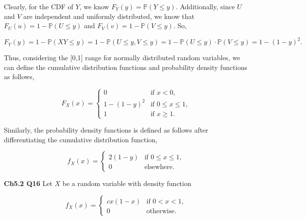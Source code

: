 \documentclass[12pt]{article}
\begin{document}
\begin{enumerate}[label=(\alph*)]
\noindent
Clearly, for the CDF of $Y$, we know $F_Y(y) = \mathbb{P}(Y \leq y)$. Additionally, since $U$ and $V$ are independent and uniformly distributed, we know that $F_U(u) = 1- \mathbb{P}(U \leq y)$ and $F_V(v) = 1- \mathbb{P}(V \leq y)$. So, 

\begin{equation*}
F_Y(y) = 1 - \mathbb{P}(XY\leq y) = 1- \mathbb{P}(U \leq y, V \leq y) = 1 - \mathbb{P}(U \leq y) \cdot \mathbb{P}(V \leq y) = 1 - (1-y)^2.
\end{equation*}

\noindent
Thus, considering the [0,1] range for normally distributed random variables, we can define the cumulative distribution functions and probability density functions as follows,

\[ F_X(x) =  \begin{cases} 
	  0 & \text{if } x < 0, \\
      1 - (1-y)^2 & \text{if } 0 \leq x \leq 1, \\
      1 & \text{if } x \geq 1.
      \end{cases} \]

\noindent
Similarly, the probability density functions is defined as follows after differentiating the cumulative distribution function,

\[ f_X(x) =  \begin{cases} 
      2(1-y)  & \text{if } 0 \leq x \leq 1, \\
      0 & \text{elsewhere}.
      \end{cases} \]

\end{enumerate}


\vspace*{1cm}
\noindent
\textbf{Ch5.2 Q16} Let $X$ be a random variable with density function

\[ f_X(x) =  \begin{cases} 
	  cx(1-x) & \text{if } 0 < x < 1, \\
      0 & \text{otherwise}.
      \end{cases} \]
      
\end{document}
